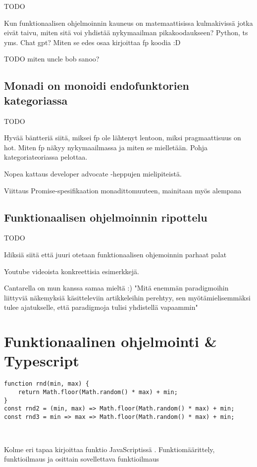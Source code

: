 TODO

Kun funktionaalisen ohjelmoinnin kauneus on matemaattisissa kulmakivissä jotka eivät taivu, miten sitä voi yhdistää nykymaailman pikakoodaukseen? Python, \gls{ts} yms. Chat gpt? Miten se edes osaa kirjoittaa fp koodia :D

TODO miten uncle bob sanoo? \cite{martin2017pragmaticfp}

\subsection{Monadi on monoidi endofunktorien kategoriassa}

TODO

Hyvää bäntteriä siitä, miksei fp ole lähtenyt lentoon, miksi pragmaattisuus on hot. Miten fp näkyy nykymaailmassa ja miten se mielletään. Pohja kategoriateoriassa pelottaa.

Nopea kattaus {developer advocate} -heppujen mielipiteistä.

Viittaus Promise-spesifikaation monadittomuuteen, mainitaan myös alempana

\subsection{Funktionaalisen ohjelmoinnin ripottelu}

TODO

Idiksiä siitä että juuri otetaan funktionaalisen ohjemoinnin parhaat palat

Youtube videoista konkreettisia esimerkkejä.

Cantarella on mun kanssa samaa mieltä :) "Mitä enemmän paradigmoihin liittyviä näkemyksiä käsitteleviin artikkeleihin perehtyy, sen myötämielisemmäksi tulee ajatukselle, että paradigmoja tulisi yhdistellä vapaammin"  \cite[45]{cantarella_fp_haitat}

\section{Funktionaalinen ohjelmointi \& Typescript}


\begin{code}
	\begin{verbatim}
function rnd(min, max) { 
	return Math.floor(Math.random() * max) + min;
}
const rnd2 = (min, max) => Math.floor(Math.random() * max) + min;
const rnd3 = min => max => Math.floor(Math.random() * max) + min;



\end{verbatim}
	\caption{Kolme eri tapaa kirjoittaa funktio JavaScriptissä \cite{okhravi-g-discussion}. Funktiomäärittely, funktioilmaus ja osittain sovellettava funktioilmaus}
	\label{code:javascript_function_types}
\end{code}


